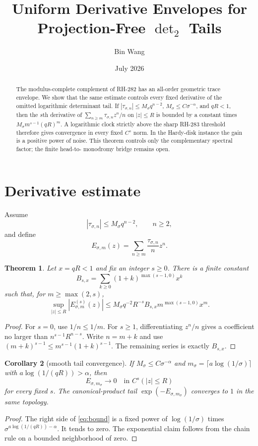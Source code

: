 \documentclass[11pt]{article}
\title{Uniform Derivative Envelopes for Projection-Free $\det_2$ Tails}
\author{Bin Wang}\date{July 2026}
\newtheorem{theorem}{Theorem}[section]
\newtheorem{corollary}[theorem]{Corollary}
\theoremstyle{remark}\newtheorem{remark}[theorem]{Remark}
\begin{document}
\maketitle
\begin{abstract}
The modulus-complete complement of RH-282 has an all-order geometric trace
envelope.  We show that the same estimate controls every fixed derivative of
the omitted logarithmic determinant tail.  If
$|\tau_{\sigma,n}|\le M_\sigma q^{n-2}$,
$M_\sigma\le C\sigma^{-\alpha}$, and $qR<1$, then the $s$th derivative of
$\sum_{n\ge m}\tau_{\sigma,n}z^n/n$ on $|z|\le R$ is bounded by a constant
times $M_\sigma m^{s-1}(qR)^m$.  A logarithmic clock strictly above the sharp
RH-283 threshold therefore gives convergence in every fixed $C^s$ norm.  In
the Hardy-disk instance the gain is a positive power of noise.  This theorem
controls only the complementary spectral factor; the finite head-to-
monodromy bridge remains open.
\end{abstract}

\section{Derivative estimate}
Assume
\[
 |\tau_{\sigma,n}|\le M_\sigma q^{n-2},\qquad n\ge2,
\]
and define
\[
 E_{\sigma,m}(z)=\sum_{n\ge m}\frac{\tau_{\sigma,n}}n z^n.
\]

\begin{theorem}\label{thm:derivative}
Let $x=qR<1$ and fix an integer $s\ge0$.  There is a finite constant
\[
 B_{s,x}=\sum_{k\ge0}(1+k)^{\max(s-1,0)}x^k
\]
such that, for $m\ge\max(2,s)$,
\begin{equation}\label{eq:bound}
 \sup_{|z|\le R}|E_{\sigma,m}^{(s)}(z)|
 \le M_\sigma q^{-2}R^{-s}B_{s,x}
 m^{\max(s-1,0)}x^m.
\end{equation}
\end{theorem}
\begin{proof}
For $s=0$, use $1/n\le1/m$.  For $s\ge1$, differentiating $z^n/n$ gives a
coefficient no larger than $n^{s-1}R^{n-s}$.  Write $n=m+k$ and use
$(m+k)^{s-1}\le m^{s-1}(1+k)^{s-1}$.  The remaining series is exactly
$B_{s,x}$.
\end{proof}

\begin{corollary}[smooth tail convergence]
If $M_\sigma\le C\sigma^{-\alpha}$ and
$m_\sigma=\lceil a\log(1/\sigma)\rceil$ with
$a\log(1/(qR))>\alpha$, then
\[
 E_{\sigma,m_\sigma}\longrightarrow0
 \quad\text{in }C^s(|z|\le R)
\]
for every fixed $s$.  The canonical-product tail
$\exp(-E_{\sigma,m_\sigma})$ converges to $1$ in the same topology.
\end{corollary}
\begin{proof}
The right side of \eqref{eq:bound} is a fixed power of
$\log(1/\sigma)$ times
$\sigma^{a\log(1/(qR))-\alpha}$.  It tends to zero.  The exponential claim
follows from the chain rule on a bounded neighborhood of zero.
\end{proof}
\end{document}
